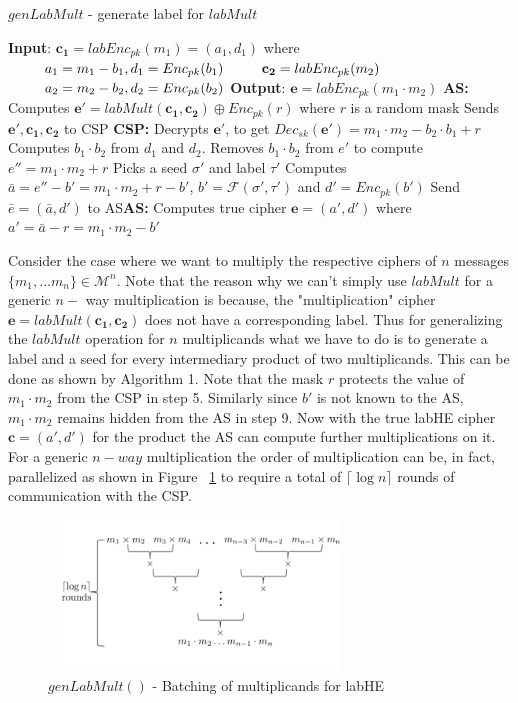 \begin{algorithm}
\caption{$genLabMult$ - generate label for $labMult$}
\begin{algorithmic}[1]
\STATEx
\textbf{Input}: $\mathbf{c_1}=labEnc_{pk}(m_1)=(a_1,d_1)$  where\STATEx $\hspace{0.9cm} a_1= m_1-b_1, d_1=Enc_{pk}(b_1)$\STATEx $\hspace{0.9cm} \mathbf{c_2}=labEnc_{pk}(m_2)$
\STATEx$\hspace{0.9cm} a_2= m_2-b_2, d_2=Enc_{pk}(b_2)$
\STATEx \textbf{Output}: $\mathbf{e}=labEnc_{pk}(m_1\cdot m_2)$ 
\STATEx \textbf{\textsf{AS}:} \STATE Computes $\textbf{e}'=labMult(\mathbf{c_1,c_2}) \oplus Enc_{pk}(r)$ where $r$ is a random mask \STATE Sends $\mathbf{e'},\mathbf{c_1},\mathbf{c_2}$ to \textsf{CSP}
\STATEx \textbf{\textsf{CSP}:}
\STATE Decrypts $\mathbf{e'}$, to get $Dec_{sk}(\mathbf{e}')=m_1\cdot m_2 -b_2\cdot b_1 + r$
\STATE Computes $b_1 \cdot b_2$ from $d_1$ and $d_2$.
\STATE Removes $b_1\cdot b_2$ from $e'$ to compute $e''=m_1\cdot m_2+r$
\STATE Picks a seed $\sigma'$ and label $\tau'$
\STATE Computes $\bar{a}=e''-b'=m_1\cdot m_2 +r -b'$, $b'=\mathcal{F}(\sigma',\tau')$ and $d'=Enc_{pk}(b')$
\STATE Send $\bar{e}=(\bar{a},d')$ to \textsf{AS}\STATEx \textbf{\textsf{AS}:}
\STATE Computes true cipher $\mathbf{e}=(a',d')$ where $a'=\bar{a}-r=m_1\cdot m_2 - b'$
 \end{algorithmic}
\end{algorithm}
Consider the case where we want to multiply the respective ciphers of  $n$ messages $\{m_1,...m_n\} \in \mathcal{M}^n$. Note that the reason why we can't simply use $labMult$ for a generic $n-$ way multiplication is because, the "multiplication" cipher $\mathbf{e}=labMult(\mathbf{c_1},\mathbf{c_2})$ does not have  a corresponding label. Thus for generalizing the $labMult$ operation for $n$ multiplicands what we have to do is to generate a label and a seed for every intermediary product of two multiplicands. This can be done as shown by Algorithm 1. Note that the mask $r$ protects the value of $m_1\cdot m_2$ from the \textsf{CSP} in step 5. Similarly since $b'$ is not known to the \textsf{AS}, $m_1\cdot m_2$ remains hidden from the \textsf{AS} in step 9. Now with the true \textsf{labHE} cipher $\mathbf{c}=(a',d')$ for the product the \textsf{AS} can compute further multiplications on it.
For a generic $n-way$ multiplication the order of multiplication can be, in fact, parallelized as  shown in Figure ~\ref{genlab-fig} to require a total of $\lceil \log n\rceil$ rounds of communication with the \textsf{CSP}.
\begin{figure}\includegraphics[height=4cm,width=8cm]{kk.png} \caption{ $genLabMult()$ - Batching of multiplicands for \textsf{labHE}} \label{genlab-fig}\end{figure}\\
